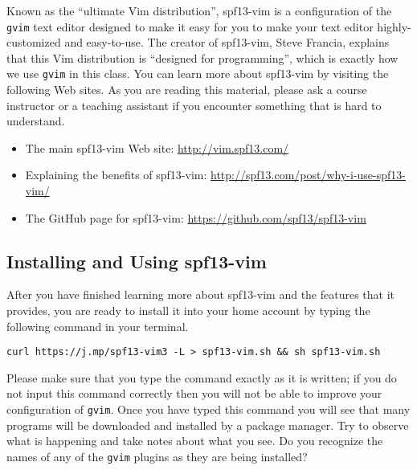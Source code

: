 Known as the ``ultimate Vim distribution'', spf13-vim is a configuration of the {\tt gvim} text editor designed to make it
easy for you to make your text editor highly-customized and easy-to-use.  The creator of spf13-vim, Steve Francia,
explains that this Vim distribution is ``designed for programming'', which is exactly how we use {\tt gvim} in this class. You
can learn more about spf13-vim by visiting the following Web sites.  As you are reading this material, please ask a
course instructor or a teaching assistant if you encounter something that is hard to understand.

\begin{itemize}
  \item The main spf13-vim Web site: \url{http://vim.spf13.com/}
  \item Explaining the benefits of spf13-vim: \url{http://spf13.com/post/why-i-use-spf13-vim/}
  \item The GitHub page for spf13-vim: \url{https://github.com/spf13/spf13-vim}
\end{itemize}

\vspace*{-.20in}
\subsection*{Installing and Using spf13-vim} 
\vspace*{-.05in}

After you have finished learning more about spf13-vim and the features that it provides, you are ready to install it
into your home account by typing the following command in your terminal.

\begin{code}
  {\tt curl https://j.mp/spf13-vim3 -L > spf13-vim.sh \&\& sh spf13-vim.sh}
\end{code}

Please make sure that you type the command exactly as it is written; if you do not input this command correctly then you
will not be able to improve your configuration of {\tt gvim}. Once you have typed this command you will see that many
programs will be downloaded and installed by a package manager.  Try to observe what is happening and take notes about
what you see. Do you recognize the names of any of the {\tt gvim} plugins as they are being installed?



\vspace*{-.15in}
